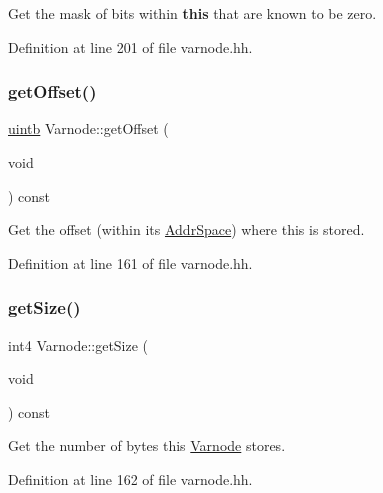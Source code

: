 Get the mask of bits within {\bfseries{this}} that are known to be zero. 



Definition at line 201 of file varnode.\+hh.

\mbox{\label{class_varnode_a8682cfcfcbb5c332c8216baf8aeaab1b}} 
\subsubsection{\texorpdfstring{getOffset()}{getOffset()}}
{\footnotesize\ttfamily \mbox{\hyperlink{types_8h_a2db313c5d32a12b01d26ac9b3bca178f}{uintb}} Varnode\+::get\+Offset (\begin{DoxyParamCaption}\item[{void}]{ }\end{DoxyParamCaption}) const\hspace{0.3cm}{\ttfamily [inline]}}



Get the offset (within its \mbox{\hyperlink{class_addr_space}{Addr\+Space}}) where this is stored. 



Definition at line 161 of file varnode.\+hh.

\mbox{\label{class_varnode_aa4503b07c50775a35605280fd7720393}} 
\subsubsection{\texorpdfstring{getSize()}{getSize()}}
{\footnotesize\ttfamily int4 Varnode\+::get\+Size (\begin{DoxyParamCaption}\item[{void}]{ }\end{DoxyParamCaption}) const\hspace{0.3cm}{\ttfamily [inline]}}



Get the number of bytes this \mbox{\hyperlink{class_varnode}{Varnode}} stores. 



Definition at line 162 of file varnode.\+hh.

\mbox{\label{class_varnode_acc7c4a2632f1814566862aeb524baf93}} 
